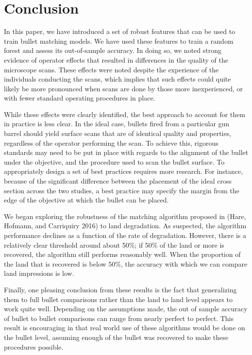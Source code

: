 \documentclass[12pt,]{article}
\theoremstyle{definition}
\theoremstyle{definition}
\theoremstyle{definition}
\theoremstyle{remark}
\begin{document}
\section{Conclusion}\label{conclusion}

In this paper, we have introduced a set of robust features that can be
used to train bullet matching models. We have used these features to
train a random forest and assess its out-of-sample accuracy. In doing
so, we noted strong evidence of operator effects that resulted in
differences in the quality of the microscope scans. These effects were
noted despite the experience of the individuals conducting the scans,
which implies that such effects could quite likely be more pronounced
when scans are done by those more inexperienced, or with fewer standard
operating procedures in place.

While these effects were clearly identified, the best approach to
account for them in practice is less clear. In the ideal case, bullets
fired from a particular gun barrel should yield surface scans that are
of identical quality and properties, regardless of the operator
performing the scan. To achieve this, rigorous standards may need to be
put in place with regards to the alignment of the bullet under the
objective, and the procedure used to scan the bullet surface. To
appropriately design a set of best practices requires more research. For
instance, because of the significant difference between the placement of
the ideal cross section across the two studies, a best practice may
specify the margin from the edge of the objective at which the bullet
can be placed.

We began exploring the robustness of the matching algorithm proposed in
(Hare, Hofmann, and Carriquiry 2016) to land degradation. As suspected,
the algorithm performance declines as a function of the rate of
degradation. However, there is a relatively clear threshold around about
50\%; if 50\% of the land or more is recovered, the algorithm still
performs reasonably well. When the proportion of the land that is
recovered is below 50\%, the accuracy with which we can compare land
impressions is low.

Finally, one pleasing conclusion from these results is the fact that
generalizing them to full bullet comparisons rather than the land to
land level appears to work quite well. Depending on the assumptions
made, the out of sample accuracy of bullet to bullet comparisons can
range from nearly perfect to perfect. This result is encouraging in that
real world use of these algorithms would be done on the bullet level,
assuming enough of the bullet was recovered to make these procedures
possible.
\end{document}
